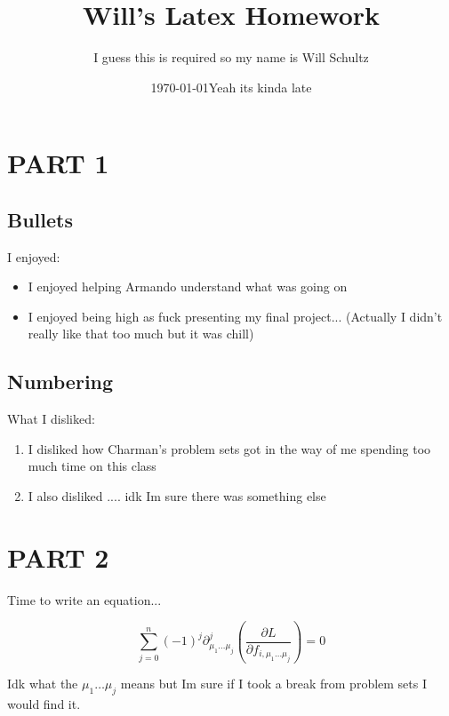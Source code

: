 \documentclass[12pt]{article}
\begin{document}
\title{Will's Latex Homework}
\author{I guess this is required so my name is Will Schultz}
\date{\today Yeah its kinda late}

\maketitle

\section{PART 1}
\subsection{Bullets}

I enjoyed:

\begin{itemize}
	\item I enjoyed helping Armando understand what was going on
	\item I enjoyed being high as fuck presenting my final project... (Actually I didn't really like that too much but it was chill)
\end{itemize}

\subsection{Numbering}

What I disliked:

\begin{enumerate}
	\item I disliked how Charman's problem sets got in the way of me spending too much time on this class
	\item I also disliked .... idk Im sure there was something else 
\end{enumerate}

\section{PART 2}

Time to write an equation...

\begin{equation}
	\sum_{j=0}^{n}(-1)^j\partial_{\mu_1 \ldots \mu_j}^j\left(\frac{\partial L}{\partial f_{i,\mu_1 \ldots \mu_j}}\right) = 0
\end{equation}

Idk what the $\mu_1 \ldots \mu_j$ means but Im sure if I took a break from problem sets I would find it.
\end{document}
